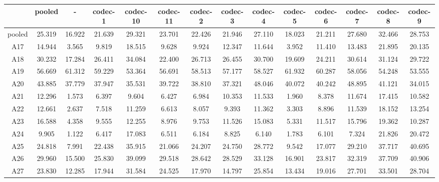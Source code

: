 \begin{tabular}{cccccccccccccc}
    \toprule
           &  pooled  &    -     & codec-1  & codec-10 & codec-11 & codec-2  & codec-3  & codec-4  & codec-5  & codec-6  & codec-7  & codec-8  & codec-9 \\ 
    \midrule
    pooled &  25.319  &  16.922  &  21.639  &  29.321  &  23.701  &  22.426  &  21.946  &  27.110  &  18.023  &  21.211  &  27.680  &  32.466  &  28.753 \\ 
     A17   &  14.944  &   3.565  &   9.819  &  18.515  &   9.628  &   9.924  &  12.347  &  11.644  &   3.952  &  11.410  &  13.483  &  21.895  &  20.135 \\ 
     A18   &  30.232  &  17.284  &  26.411  &  34.084  &  22.400  &  26.713  &  26.455  &  30.700  &  19.609  &  24.211  &  30.614  &  31.124  &  29.722 \\ 
     A19   &  56.669  &  61.312  &  59.229  &  53.364  &  56.691  &  58.513  &  57.177  &  58.527  &  61.932  &  60.287  &  58.056  &  54.248  &  53.555 \\ 
     A20   &  43.885  &  37.779  &  37.947  &  35.531  &  39.722  &  38.810  &  37.321  &  48.046  &  40.072  &  40.242  &  48.895  &  41.121  &  34.015 \\ 
     A21   &  12.296  &   1.573  &   6.397  &   9.604  &   6.427  &   6.984  &  10.353  &  11.533  &   1.960  &   8.378  &  11.674  &  17.415  &  10.582 \\ 
     A22   &  12.661  &   2.637  &   7.518  &  11.259  &   6.613  &   8.057  &   9.393  &  11.362  &   3.303  &   8.896  &  11.539  &  18.152  &  13.254 \\ 
     A23   &  16.588  &   4.358  &   9.555  &  12.255  &   8.976  &   9.753  &  11.526  &  15.083  &   5.331  &  11.517  &  15.796  &  19.362  &  10.287 \\ 
     A24   &   9.905  &   1.122  &   6.417  &  17.083  &   6.511  &   6.184  &   8.825  &   6.140  &   1.783  &   6.101  &   7.324  &  21.826  &  20.472 \\ 
     A25   &  24.818  &   7.991  &  22.438  &  35.915  &  21.066  &  24.207  &  24.750  &  28.772  &   9.542  &  17.077  &  29.210  &  37.717  &  40.695 \\ 
     A26   &  29.960  &  15.500  &  25.830  &  39.099  &  29.518  &  28.642  &  28.529  &  33.128  &  16.901  &  23.817  &  32.319  &  37.709  &  40.906 \\ 
     A27   &  23.830  &  12.285  &  17.944  &  31.584  &  24.525  &  17.970  &  14.797  &  25.854  &  13.434  &  19.016  &  27.701  &  33.501  &  28.704 \\ 

\end{tabular}
